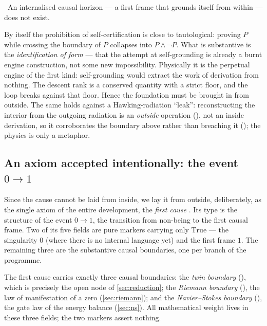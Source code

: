 \begin{theorem}\label{thm:no_internalisedHorizonBoundary}
\green{}\ An internalised causal horizon --- a first frame that grounds itself from within --- does
not exist. 
\end{theorem}

\begin{remark}
By itself the prohibition of self-certification is close to tautological: proving $P$ while crossing
the boundary of $P$ collapses into $P \wedge \lnot P$. What is substantive is the
\emph{identification of form} --- that the attempt at self-grounding is already a burnt engine
construction, not some new impossibility. Physically it is the perpetual engine of the first kind:
self-grounding would extract the work of derivation from nothing. The descent rank is a conserved
quantity with a strict floor, and the loop breaks against that floor. Hence the foundation must be
brought in from outside. The same holds against a Hawking-radiation ``leak'': reconstructing the
interior from the outgoing radiation is an \emph{outside} operation (),
not an inside derivation, so it corroborates the boundary above rather than breaching it
(); the physics is only a metaphor.
\end{remark}

\subsection{An axiom accepted intentionally: the event \texorpdfstring{$0\to1$}{0->1}}

Since the cause cannot be laid from inside, we lay it from outside, deliberately, as the single axiom
of the entire development, the \emph{first cause} \axiom{}. Its type is the structure of the event
$0 \to 1$, the transition from non-being to the first causal frame. Two of its five fields are pure
markers carrying only $\mathrm{True}$ --- the singularity $0$ (where there is no internal language
yet) and the first frame $1$. The remaining three are the substantive causal boundaries, one per
branch of the programme.

\begin{definition}\label{def:step00FirstCause}
The first cause carries exactly three causal boundaries: the \emph{twin boundary} (),
which is precisely the open node of \cref{sec:reduction}; the \emph{Riemann boundary}
(), the law of manifestation of a zero (\cref{sec:riemann}); and the
\emph{Navier--Stokes boundary} (), the gate law of the energy balance
(\cref{sec:ns}). All mathematical weight lives in these three fields; the two markers assert nothing.
\end{definition}

